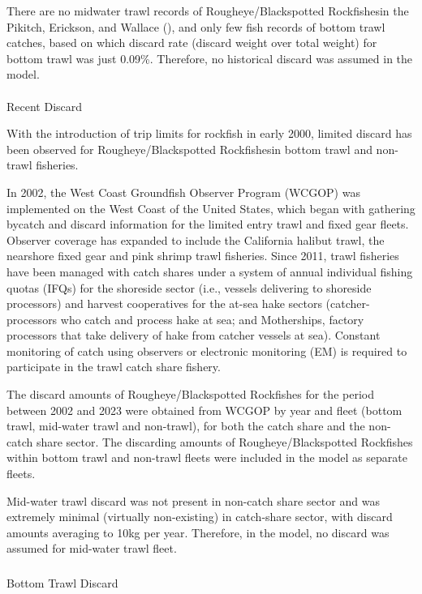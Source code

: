 \documentclass[
]{scrartcl}
\makeatletter
\let\oldparagraph\paragraph
\renewcommand{\paragraph}{
    \@ifstar
      \xxxParagraphStar
      \xxxParagraphNoStar
  }
\newcommand{\xxxParagraphStar}[1]{\oldparagraph*{#1}\mbox{}}
\newcommand{\xxxParagraphNoStar}[1]{\oldparagraph{#1}\mbox{}}
\let\oldsubparagraph\subparagraph
\renewcommand{\subparagraph}{
    \@ifstar
      \xxxSubParagraphStar
      \xxxSubParagraphNoStar
  }
\newcommand{\xxxSubParagraphStar}[1]{\oldsubparagraph*{#1}\mbox{}}
\newcommand{\xxxSubParagraphNoStar}[1]{\oldsubparagraph{#1}\mbox{}}
\makeatother
\begin{document}
There are no midwater trawl records of Rougheye/Blackspotted
Rockfishesin the Pikitch, Erickson, and Wallace
(), and only few fish
records of bottom trawl catches, based on which discard rate (discard
weight over total weight) for bottom trawl was just 0.09\%. Therefore,
no historical discard was assumed in the model.

\paragraph{Recent Discard}\label{recent-discard}

With the introduction of trip limits for rockfish in early 2000, limited
discard has been observed for Rougheye/Blackspotted Rockfishesin bottom
trawl and non-trawl fisheries.

In 2002, the West Coast Groundfish Observer Program (WCGOP) was
implemented on the West Coast of the United States, which began with
gathering bycatch and discard information for the limited entry trawl
and fixed gear fleets. Observer coverage has expanded to include the
California halibut trawl, the nearshore fixed gear and pink shrimp trawl
fisheries. Since 2011, trawl fisheries have been managed with catch
shares under a system of annual individual fishing quotas (IFQs) for the
shoreside sector (i.e., vessels delivering to shoreside processors) and
harvest cooperatives for the at-sea hake sectors (catcher-processors who
catch and process hake at sea; and Motherships, factory processors that
take delivery of hake from catcher vessels at sea). Constant monitoring
of catch using observers or electronic monitoring (EM) is required to
participate in the trawl catch share fishery.

The discard amounts of Rougheye/Blackspotted Rockfishes for the period
between 2002 and 2023 were obtained from WCGOP by year and fleet (bottom
trawl, mid-water trawl and non-trawl), for both the catch share and the
non-catch share sector. The discarding amounts of Rougheye/Blackspotted
Rockfishes within bottom trawl and non-trawl fleets were included in the
model as separate fleets.

Mid-water trawl discard was not present in non-catch share sector and
was extremely minimal (virtually non-existing) in catch-share sector,
with discard amounts averaging to 10kg per year. Therefore, in the
model, no discard was assumed for mid-water trawl fleet.

\subparagraph{Bottom Trawl Discard}\label{bottom-trawl-discard}
\end{document}
